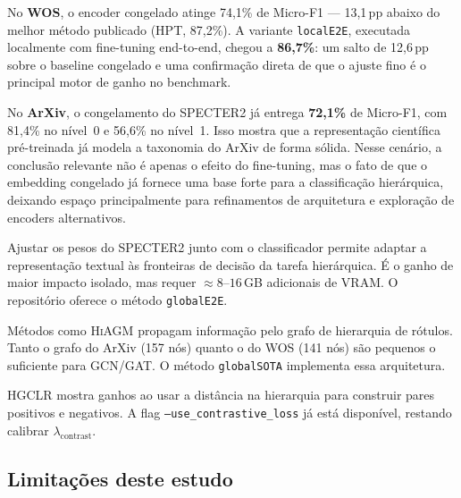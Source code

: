 \documentclass[11pt,a4paper,twoside]{article}
\begin{document}
No \textbf{WOS}, o encoder congelado atinge 74,1\% de Micro-F1 --- 13,1\,pp abaixo do
melhor método publicado (HPT, 87,2\%). A variante \texttt{localE2E}, executada
localmente com fine-tuning end-to-end, chegou a \textbf{86,7\%}: um salto de
12,6\,pp sobre o baseline congelado e uma confirmação direta de que o ajuste fino
é o principal motor de ganho no benchmark.

No \textbf{ArXiv}, o congelamento do SPECTER2 já entrega \textbf{72,1\%} de
Micro-F1, com 81,4\% no nível~0 e 56,6\% no nível~1. Isso mostra que a
representação científica pré-treinada já modela a taxonomia do ArXiv de forma
sólida. Nesse cenário, a conclusão relevante não é apenas o efeito do
fine-tuning, mas o fato de que o embedding congelado já fornece uma base forte
para a classificação hierárquica, deixando espaço principalmente para
refinamentos de arquitetura e exploração de encoders alternativos.

\begin{description}[leftmargin=*, itemsep=4pt, font=\bfseries]

  \item[Fine-tuning end-to-end (est.\ +5\,pp).]
  Ajustar os pesos do \textsc{SPECTER2} junto com o classificador permite
  adaptar a representação textual às fronteiras de decisão da tarefa hierárquica.
  É o ganho de maior impacto isolado, mas requer $\approx 8$--$16$\,GB adicionais
  de VRAM. O repositório oferece o método \texttt{globalE2E}.

  \item[Label-graph GNN (est.\ +4--6\,pp).]
  Métodos como \textsc{HiAGM} \cite{zhou2020hiagm} propagam informação pelo
  grafo de hierarquia de rótulos. Tanto o grafo do ArXiv (157 nós) quanto o do
  WOS (141 nós) são pequenos o suficiente para GCN/GAT. O método
  \texttt{globalSOTA} implementa essa arquitetura.

  \item[Perda contrastiva hierárquica (est.\ +2--4\,pp).]
  \textsc{HGCLR} \cite{wang2022hgclr} mostra ganhos ao usar a distância na
  hierarquia para construir pares positivos e negativos. A flag
  \texttt{--use\_contrastive\_loss} já está disponível, restando calibrar
  $\lambda_{\text{contrast}}$.

\end{description}

\subsection{Limitações deste estudo}
\end{document}
